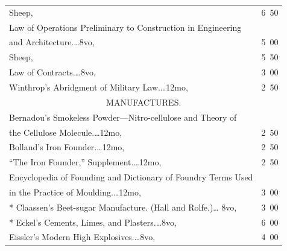 \documentclass[a4paper,12pt]{book}[2004/02/16]
\providecommand{\colorbox}[2]{#2}
\newcommand{\correction}[2]{\colorbox{corr}{#1}}
\theoremstyle{ilemma}
\theoremstyle{itheorem}
\theoremstyle{iother}
\theoremstyle{icorollary}
\theoremstyle{numcorollary}
\theoremstyle{idefinition}
\begin{document}
\begin{longtable}{@{}l@{ }r@{}}
\nopagebreak

\hfill Sheep, &6\ 50\\

\indent Law of Operations Preliminary to Construction in Engineering\\

\nopagebreak

\indent\indent and Architecture.\dotfill\ldots 8vo, &5\ 00\\

\nopagebreak

\hfill Sheep, &5\ 50\\

\indent Law of Contracts.\dotfill\ldots 8vo, &3\ 00\\

Winthrop's Abridgment of Military Law.\dotfill\ldots 12mo, &2\ 50\\[3em]



\multicolumn{2}{c}{\large MANUFACTURES.}\\[1em]

\nopagebreak

Bernadou's Smokeless Powder---Nitro-cellulose and Theory of\\

\nopagebreak

\indent\indent the Cellulose Molecule.\dotfill\ldots 12mo, &2\ 50\\

Bolland's Iron Founder.\dotfill\ldots 12mo, &2\ 50\\

\nopagebreak

\indent \correction{``}{}The Iron Founder,'' Supplement.\dotfill\ldots 12mo, &2\ 50\\

\indent Encyclopedia of Founding and Dictionary of Foundry Terms Used\\

\nopagebreak

\indent\indent in the Practice of Moulding.\dotfill\ldots 12mo, &3\ 00\\

* Claassen's Beet-sugar Manufacture. (Hall and Rolfe.)\dotfill\ldots
  8vo, &3\ 00\\

* Eckel's Cements, Limes, and Plasters.\dotfill\ldots 8vo, &6\ 00\\

Eissler's Modern High Explosives.\dotfill\ldots 8vo, &4\ 00\\


\end{longtable}
\end{document}
